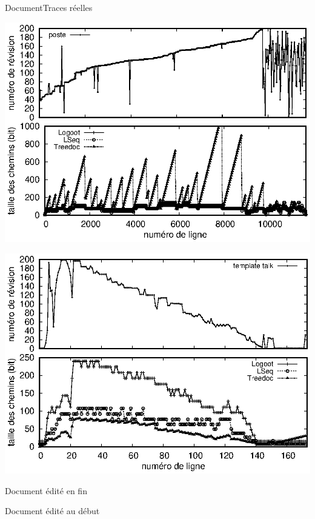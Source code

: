 \begin{frame}{Document}{Traces réelles}
  
  \hspace{-1cm}
  \begin{minipage}{0.45\textwidth}
    \includegraphics[width=1.29\textwidth]{img/replication/poste.eps}
  \end{minipage}
  \hspace{1.2cm}
  \begin{minipage}{0.45\textwidth}
      {\includegraphics[width=1.29\textwidth]{img/replication/templatetalk.eps}}%
  \end{minipage}

  \begin{minipage}{0.4\textwidth}
    Document édité en fin
  \end{minipage}
  \hspace{1.6cm}
  \begin{minipage}{0.4\textwidth}
      {Document édité au début}%
  \end{minipage}

\end{frame}


